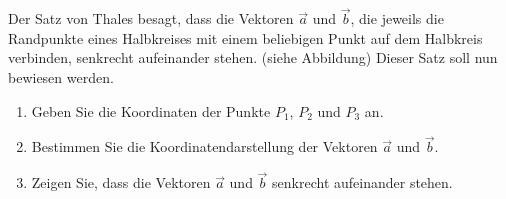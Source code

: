 \begin{ExerciseBlock}
Der Satz von Thales besagt, dass die Vektoren $\vec{a}$ und $\vec{b}$, die jeweils die Randpunkte eines Halbkreises mit einem beliebigen Punkt auf dem Halbkreis verbinden, senkrecht aufeinander stehen. (siehe Abbildung) Dieser Satz soll nun bewiesen werden. 

\begin{center}
\end{center}

\begin{enumerate}[label=\alph*)]
	\item Geben Sie die Koordinaten der Punkte $P_1$, $P_2$ und $P_3$ an.
	\item Bestimmen Sie die Koordinatendarstellung der Vektoren $\vec{a}$ und $\vec{b}$.
	\item Zeigen Sie, dass die Vektoren $\vec{a}$ und $\vec{b}$ senkrecht aufeinander stehen.
\end{enumerate}

\end{ExerciseBlock}
